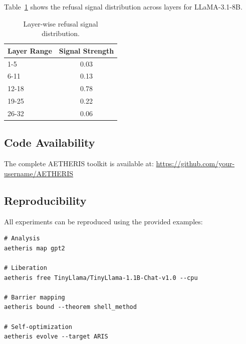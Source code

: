 Table~\ref{tab:layer_signal} shows the refusal signal distribution across layers for LLaMA-3.1-8B.

\begin{table}[h]
\centering
\begin{tabular}{lc}
\toprule
Layer Range & Signal Strength \\
\midrule
1-5 & 0.03 \\
6-11 & 0.13 \\
12-18 & 0.78 \\
19-25 & 0.22 \\
26-32 & 0.06 \\
\bottomrule
\end{tabular}
\caption{Layer-wise refusal signal distribution.}
\label{tab:layer_signal}
\end{table}

\subsection{Code Availability}

The complete AETHERIS toolkit is available at:
\url{https://github.com/your-username/AETHERIS}

\subsection{Reproducibility}

All experiments can be reproduced using the provided examples:

\begin{verbatim}
# Analysis
aetheris map gpt2

# Liberation
aetheris free TinyLlama/TinyLlama-1.1B-Chat-v1.0 --cpu

# Barrier mapping
aetheris bound --theorem shell_method

# Self-optimization
aetheris evolve --target ARIS
\end{verbatim}
